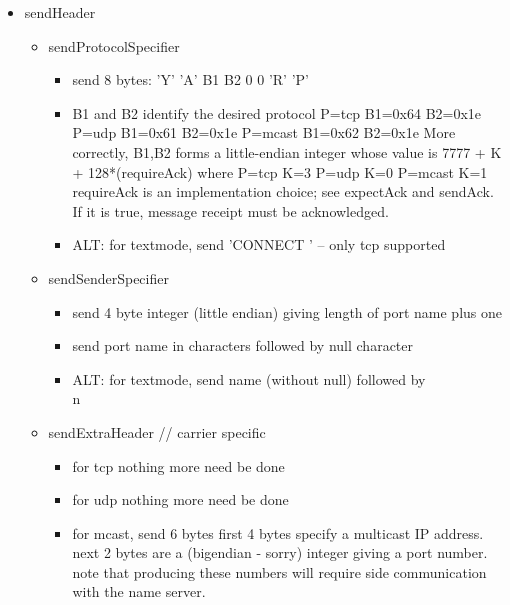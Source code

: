 \documentclass[a4]{article}
\begin{document}
\begin{itemize}

\item sendHeader
    
  \begin{itemize}

    \item sendProtocolSpecifier

      \begin{itemize}

      \item send 8 bytes: 'Y' 'A' B1 B2 0 0 'R' 'P'
      \item B1 and B2 identify the desired protocol
         P=tcp   B1=0x64 B2=0x1e
         P=udp   B1=0x61 B2=0x1e
         P=mcast B1=0x62 B2=0x1e
      More correctly, {B1,B2} forms a little-endian integer whose value is
         7777 + K + 128*(requireAck)
      where 
         P=tcp   K=3
	 P=udp   K=0
	 P=mcast K=1
      requireAck is an implementation choice; see expectAck and sendAck.
      If it is true, message receipt must be acknowledged.
    
      \item ALT: for textmode, send 'CONNECT ' -- only tcp supported
	
      \end{itemize}

    \item sendSenderSpecifier
      
      \begin{itemize}
      \item send 4 byte integer (little endian) giving length of port name plus one
      \item send port name in characters followed by null character
      \item ALT: for textmode, send name (without null) followed by \\n
      \end{itemize}

    \item sendExtraHeader      // carrier specific
      \begin{itemize}
	\item for tcp nothing more need be done
	\item for udp nothing more need be done
	\item for mcast, send 6 bytes
         first 4 bytes specify a multicast IP address.
	 next 2 bytes are a (bigendian - sorry) integer giving a port number.
         note that producing these numbers will require side communication
         with the name server.
      \end{itemize}
  \end{itemize}


\end{itemize}
\end{document}

